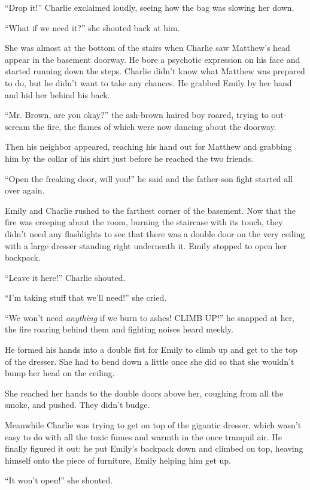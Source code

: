 “Drop it!” Charlie exclaimed loudly, seeing how the bag was slowing her down.

“What if we need it?” she shouted back at him.

She was almost at the bottom of the stairs when Charlie saw Matthew's head appear in the basement doorway. He bore a psychotic expression on his face and started running down the steps. Charlie didn't know what Matthew was prepared to do, but he didn't want to take any chances. He grabbed Emily by her hand and hid her behind his back.

“Mr. Brown, are you okay?” the ash-brown haired boy roared, trying to out-scream the fire, the flames of which were now dancing about the doorway.

Then his neighbor appeared, reaching his hand out for Matthew and grabbing him by the collar of his shirt just before he reached the two friends.

“Open the freaking door, will you!” he said and the father-son fight started all over again.

Emily and Charlie rushed to the farthest corner of the basement. Now that the fire was creeping about the room, burning the staircase with its touch, they didn't need any flashlights to see that there was a double door on the very ceiling with a large dresser standing right underneath it. Emily stopped to open her backpack.

“Leave it here!” Charlie shouted.

“I'm taking stuff that we'll need!” she cried.

“We won't need \textit{anything} if we burn to ashes! CLIMB UP!” he snapped at her, the fire roaring behind them and fighting noises heard meekly.

He formed his hands into a double fist for Emily to climb up and get to the top of the dresser. She had to bend down a little once she did so that she wouldn't bump her head on the ceiling.

She reached her hands to the double doors above her, coughing from all the smoke, and pushed. They didn't budge.

Meanwhile Charlie was trying to get on top of the gigantic dresser, which wasn't easy to do with all the toxic fumes and warmth in the once tranquil air. He finally figured it out: he put Emily's backpack down and climbed on top, heaving himself onto the piece of furniture, Emily helping him get up.

“It won't open!” she shouted.

